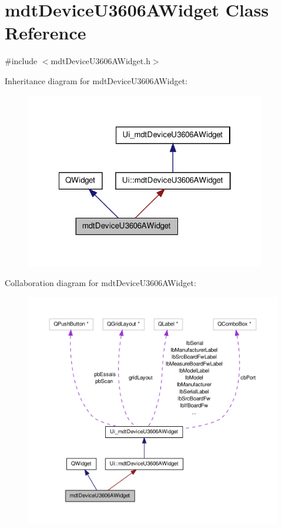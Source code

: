 \hypertarget{classmdt_device_u3606_a_widget}{\section{mdt\-Device\-U3606\-A\-Widget Class Reference}
\label{classmdt_device_u3606_a_widget}
}


{\ttfamily \#include $<$mdt\-Device\-U3606\-A\-Widget.\-h$>$}



Inheritance diagram for mdt\-Device\-U3606\-A\-Widget\-:\nopagebreak
\begin{figure}[H]
\begin{center}
\leavevmode
\includegraphics[width=298pt]{classmdt_device_u3606_a_widget__inherit__graph}
\end{center}
\end{figure}


Collaboration diagram for mdt\-Device\-U3606\-A\-Widget\-:\nopagebreak
\begin{figure}[H]
\begin{center}
\leavevmode
\includegraphics[width=350pt]{classmdt_device_u3606_a_widget__coll__graph}
\end{center}
\end{figure}
